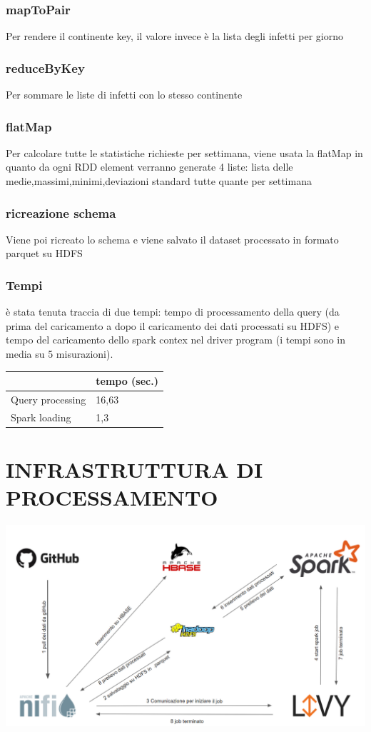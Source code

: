 \documentclass[acmsmall]{acmart}
\begin{document}
\subsubsection{mapToPair}
Per rendere il continente key, il valore invece è la lista degli infetti per giorno 
\subsubsection{reduceByKey}
Per sommare le liste di infetti con lo stesso continente

\subsubsection{flatMap}
Per calcolare tutte le statistiche richieste per settimana, viene usata la flatMap in quanto da ogni RDD element verranno generate 4 liste:
lista delle medie,massimi,minimi,deviazioni standard tutte quante per settimana 
\subsubsection{ricreazione schema}
Viene poi ricreato lo schema e viene salvato il dataset processato in formato parquet su HDFS

\subsubsection{Tempi}
è stata tenuta traccia di due tempi: tempo di processamento della query (da prima del caricamento a dopo il caricamento dei dati processati su HDFS) e tempo del caricamento dello spark contex nel driver program (i tempi sono in media su 5 misurazioni).

\hspace{40mm} \begin{tabular}{l|l|}
\cline{2-2}
                                       & tempo (sec.) \\ \hline
\multicolumn{1}{|l|}{Query processing} & 16,63            \\ \hline
\multicolumn{1}{|l|}{Spark loading}    & 1,3            \\ \hline
\end{tabular}


\section{INFRASTRUTTURA DI PROCESSAMENTO}


\includegraphics[width=14cm]{sistema.png}
\end{document}
